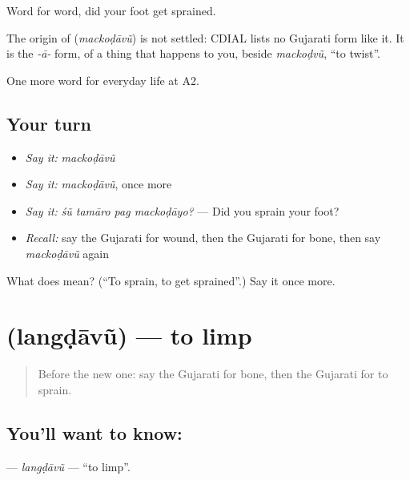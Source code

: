 Word for word, did your foot get sprained.

\begin{cousinweb}
The origin of \textbf{} (\emph{mackoḍāvũ}) is not settled: CDIAL lists no Gujarati form like it. It is the \emph{-ā-} form, of a thing that happens to you, beside \emph{mackoḍvũ}, \textquotedblleft{}to twist\textquotedblright{}.
\end{cousinweb}

\begin{grammarlens}[title={What you've built}]
One more word for everyday life at A2.
\end{grammarlens}

\subsection*{Your turn}
\begin{itemize}
\raggedright
  \item \emph{Say it:} \emph{mackoḍāvũ}
  \item \emph{Say it:} \emph{mackoḍāvũ}, once more
  \item \emph{Say it:} \emph{śũ tamāro pag mackoḍāyo?} — Did you sprain your foot?
  \item \emph{Recall:} say the Gujarati for wound, then the Gujarati for bone, then say \emph{mackoḍāvũ} again
\end{itemize}

\begin{tcolorbox}[breakable,colback=teal!4,colframe=teal!35!black,title={Before you move on}]
What does  mean? (\textquotedblleft{}To sprain, to get sprained\textquotedblright{}.) Say it once more.
\end{tcolorbox}
\section[\texorpdfstring{\gu{લંગડાવું} (langḍāvũ)}{લંગડાવું (langḍāvũ)}]{ (langḍāvũ) — to limp}

\label{lesson:GU-C227-langdavu}



\begin{quote}
Before the new one: say the Gujarati for bone, then the Gujarati for to sprain.
\end{quote}

\subsection*{You'll want to know: }
\textbf{} — \emph{langḍāvũ} — \textquotedblleft{}to limp\textquotedblright{}.


